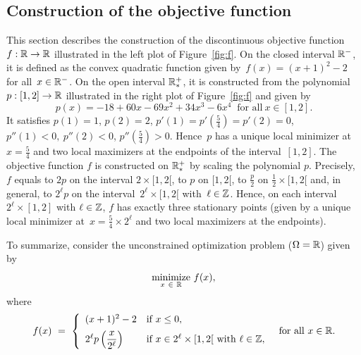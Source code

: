 \subsection{Construction of the objective function}
\label{sec:counterexample/f}

This section describes the construction of the discontinuous objective function $f : \mathbb{R} \to \mathbb{R}$ illustrated in the left plot of Figure~\ref{fig:f}.
On the closed interval $\mathbb{R}^-$, it is defined as the convex quadratic function given by~$f(x) = (x+1)^2-2$ for all~$x \in \mathbb{R}^-$.
On the open interval $\mathbb{R}^+_*$, it is constructed from the polynomial~$p : [1,2] \to \mathbb{R}$ illustrated in the right plot of Figure~\ref{fig:f} and given by
\begin{equation*}
	\label{eq:p}
	p(x) = -18 + 60x -69 x^2 + 34 x^3 - 6x^4 ~\mbox{ for all}~ x \in [1,2].
\end{equation*}
It satisfies $p(1) = 1$, $p(2) = 2$, $p'(1) = p'\left(\frac{5}{4}\right) = p'(2) = 0$, $p''(1) < 0,~ p''(2) < 0$, $p''\left(\frac{5}{4}\right) > 0$. Hence~$p$ has a unique local minimizer at $x = \frac{5}{4}$ and two local maximizers at the endpoints of the interval~$[1,2]$.
The objective function $f$ is constructed on $\mathbb{R}^+_*$ by scaling the polynomial $p$. Precisely, $f$ equals to $2p$ on the interval $2\times[1,2[$, to $p$ on $[1,2[$, to $\frac{p}{2}$ on $\frac{1}{2}\times[1,2[$ and, in general, to $2^\ell p$ on the interval~$2^\ell\times[1,2[$ with~$\ell \in \mathbb{Z}$.
Hence, on each interval $2^\ell \times [1, 2]$ with $\ell \in \mathbb{Z}$, $f$ has exactly three stationary points (given by a unique local minimizer at~$x = \frac{5}{4} \times 2^\ell$ and two local maximizers at the endpoints).

To summarize, consider the unconstrained optimization problem ($\Omega = \mathbb{R}$) given by
\begin{equation*}
	\label{eq:problem}
	\underset{x ~\in~ \mathbb{R}}{\operatorname*{minimize}}~ f(x),
\end{equation*}
where
\begin{equation*}
	f(x) \ = \
	\left\{\begin{array}{ll}
		(x+1)^2-2
		& \mbox{if}~ x \leq 0, \\[5pt]
		2^\ell p\left(\dfrac{x}{2^\ell}\right)
		& \mbox{if}~ x \in 2^\ell\times[1,2[ \mbox{ with } \ell \in \mathbb{Z}, \\
	\end{array}\right. ~\mbox{ for all}~ x \in \mathbb{R}.
\end{equation*}

